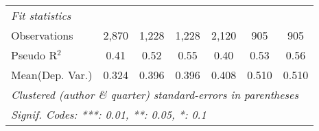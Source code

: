 \begin{tabular}{lcccccc}
   \midrule
   \emph{Fit statistics}\\
   Observations            & 2,870   & 1,228   & 1,228        & 2,120   & 905     & 905\\  
   Pseudo R$^2$            & 0.41    & 0.52    & 0.55         & 0.40    & 0.53    & 0.56\\  
Mean(Dep. Var.) & 0.324 & 0.396 & 0.396 & 0.408 & 0.510 & 0.510 \\
   \midrule \midrule
   \multicolumn{7}{l}{\emph{Clustered (author \& quarter) standard-errors in parentheses}}\\
   \multicolumn{7}{l}{\emph{Signif. Codes: ***: 0.01, **: 0.05, *: 0.1}}\\
\end{tabular}
\par\endgroup

